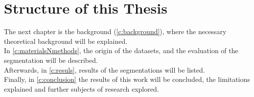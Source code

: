 \section{Structure of this Thesis}\label{s:introduction-structureofthisthesis}
The next chapter is the background (\cref{c:background}), where the necessary theoretical background will be explained.\\
In \cref{c:materialsNmethods}, the origin of the datasets, and the evaluation of the segmentation will be described.\\
Afterwards, in \cref{c:resuls}, results of the segmentations will be listed.\\
Finally, in \cref{c:conclusion} the results of this work will be concluded, 
the limitations explained and further subjects of research explored.
